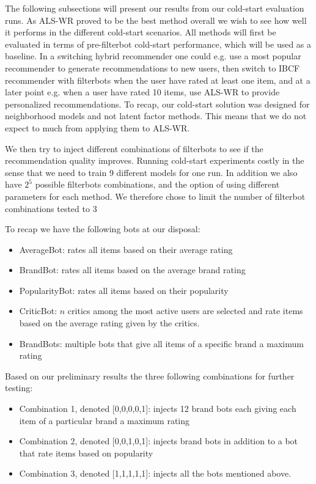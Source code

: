 The following subsections will present our results from our cold-start evaluation runs. As ALS-WR proved to be the best method overall we wish to
see how well it performs in the different cold-start scenarios. All methods will first be evaluated in terms of pre-filterbot cold-start performance,
which will be used as a baseline. In a switching hybrid recommender one could e.g. use a most popular recommender to generate recommendations to new users,
then switch to IBCF recommender with filterbots when the user have rated at least one item, and at a later point e.g. when a user have rated 10 items,
use ALS-WR to provide personalized recommendations. To recap, our cold-start solution was designed for neighborhood models and not latent factor methods.
This means that we do not expect to much from applying them to ALS-WR.

We then try to inject different combinations of filterbots to see if the recommendation quality improves. Running cold-start experiments costly in the sense
that we need to train 9 different models for one run. In addition we also have $2^5$ possible filterbots combinations, and
the option of using different parameters for each method. We therefore chose to limit the number of filterbot combinations tested to 3

To recap we have the following bots at our disposal:

\begin{itemize}
\item AverageBot: rates all items based on their average rating
\item BrandBot: rates all items based on the average brand rating
\item PopularityBot: rates all items based on their popularity
\item CriticBot: $n$ critics among the most active users are selected and rate items based on the average
	  rating given by the critics.
\item BrandBots: multiple bots that give all items of a specific brand a maximum rating
\end{itemize}

Based on our preliminary results the three following combinations for further testing:

\begin{itemize}
\item Combination 1, denoted [0,0,0,0,1]: injects 12 brand bots each giving each item of a particular brand a maximum rating
\item Combination 2, denoted [0,0,1,0,1]: injects brand bots in addition to a bot that rate items based on popularity
\item Combination 3, denoted [1,1,1,1,1]: injects all the bots mentioned above.
\end{itemize}

